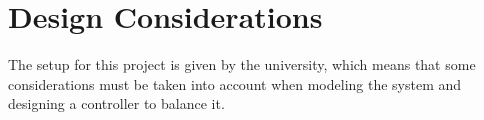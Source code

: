 \chapter{Design Considerations}
The setup for this project is given by the university, which means that some considerations must be taken into account when modeling the system and designing a controller to balance it.